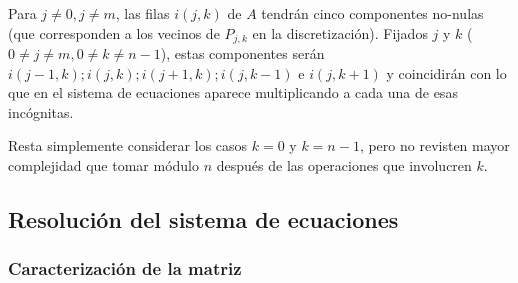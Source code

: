 Para $j \not = 0, j \not = m$, las filas $i(j,k)$ de $A$ tendrán cinco componentes no-nulas (que corresponden a los vecinos de $P_{j,k}$ en la discretización). Fijados $j$ y $k$ ($0\not=j\not=m, 0\not=k\not=n-1$), estas componentes serán $i(j-1,k); i(j,k); i(j+1,k); i(j,k-1)$ e $i(j,k+1)$ y coincidirán con lo que en el sistema de ecuaciones aparece multiplicando a cada una de esas incógnitas.

Resta simplemente considerar los casos $k=0$ y $k=n-1$, pero no revisten mayor complejidad que tomar módulo $n$ después de las operaciones que involucren $k$.

\subsection{Resolución del sistema de ecuaciones}
\subsubsection{Caracterización de la matriz}

